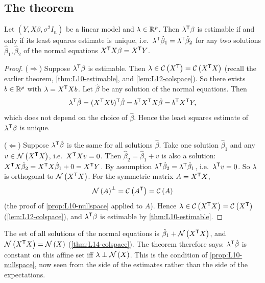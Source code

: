 \subsection{The theorem}
\begin{theorem}\label{thm:L13-unique}
Let $(Y,X\beta,\sigma^2I_n)$ be a linear model and $\lambda\in\mathbb R^p$. Then $\lambda^{\mathsf T}\beta$ is estimable if and
only if its least squares estimate is unique, i.e.\ $\lambda^{\mathsf T}\hat\beta_1=\lambda^{\mathsf T}\hat\beta_2$ for any two
solutions $\hat\beta_1,\hat\beta_2$ of the normal equations $X^{\mathsf T} X\beta=X^{\mathsf T} Y$.
\end{theorem}
\begin{proof}
($\Rightarrow$) Suppose $\lambda^{\mathsf T}\beta$ is estimable. Then $\lambda\in\mathcal{C}\left(X^{\mathsf T}\right)=\mathcal{C}\left(X^{\mathsf T} X\right)$ (recall the earlier
theorem, \cref{thm:L10-estimable}, and \cref{lem:L12-colspace}). So there exists $b\in\mathbb R^p$ with
$\lambda=X^{\mathsf T} Xb$. Let $\hat\beta$ be any solution of the normal equations. Then
\[
\lambda^{\mathsf T}\hat\beta=(X^{\mathsf T} Xb)^{\mathsf T}\hat\beta=b^{\mathsf T} X^{\mathsf T} X\hat\beta=b^{\mathsf T} X^{\mathsf T} Y ,
\]
which does not depend on the choice of $\hat\beta$. Hence the least squares estimate of $\lambda^{\mathsf T}\beta$
is unique.

($\Leftarrow$) Suppose $\lambda^{\mathsf T}\hat\beta$ is the same for all solutions $\hat\beta$. Take one solution $\hat\beta_1$ and any
$v\in\mathcal{N}\left(X^{\mathsf T} X\right)$, i.e.\ $X^{\mathsf T} Xv=0$. Then $\hat\beta_2=\hat\beta_1+v$ is also a solution:
$X^{\mathsf T} X\hat\beta_2=X^{\mathsf T} X\hat\beta_1+0=X^{\mathsf T} Y$. By assumption $\lambda^{\mathsf T}\hat\beta_2=\lambda^{\mathsf T}\hat\beta_1$, i.e.\ $\lambda^{\mathsf T} v=0$. So $\lambda$ is
orthogonal to $\mathcal{N}\left(X^{\mathsf T} X\right)$. For the symmetric matrix $A=X^{\mathsf T} X$,
\[
\mathcal{N}\left(A\right)^\perp=\mathcal{C}\left(A^{\mathsf T}\right)=\mathcal{C}\left(A\right)
\]
(the proof of \cref{prop:L10-nullspace} applied to $A$). Hence
$\lambda\in\mathcal{C}\left(X^{\mathsf T} X\right)=\mathcal{C}\left(X^{\mathsf T}\right)$ (\cref{lem:L12-colspace}), and $\lambda^{\mathsf T}\beta$ is estimable by \cref{thm:L10-estimable}.
\end{proof}

\begin{note}
The set of all solutions of the normal equations is $\hat\beta_1+\mathcal{N}\left(X^{\mathsf T} X\right)$, and
$\mathcal{N}\left(X^{\mathsf T} X\right)=\mathcal{N}\left(X\right)$ (\cref{thm:L14-colspace}). The theorem therefore says: $\lambda^{\mathsf T}\hat\beta$ is constant on
this affine set iff $\lambda\perp\mathcal{N}\left(X\right)$. This is the condition of \cref{prop:L10-nullspace}, now seen
from the side of the estimates rather than the side of the expectations.
\end{note}

